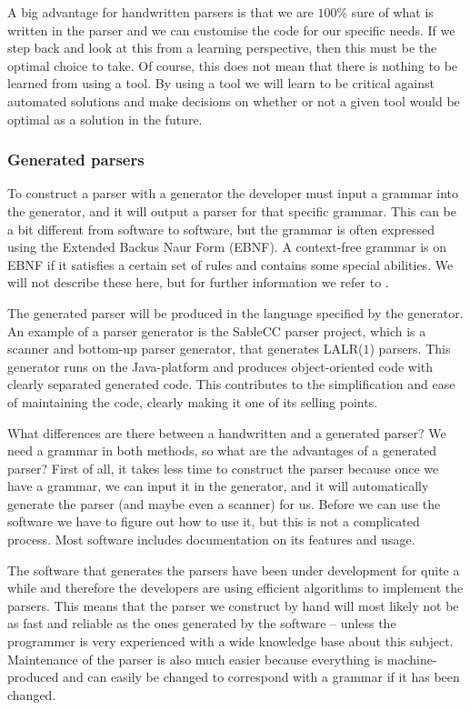 A big advantage for handwritten parsers is that we are $100 \%$ sure of what is
written in the parser and we can customise the code for our specific needs. If
we step back and look at this from a learning perspective, then this must be the
optimal choice to take. Of course, this does not mean that there is nothing to
be learned from using a tool. By using a tool we will learn to be critical
against automated solutions and make decisions on whether or not a given tool
would be optimal as a solution in the future.

\subsubsection{Generated parsers}
\label{subsec:generatedparsers}
To construct a parser with a generator the developer must input a grammar into
the generator, and it will output a parser for that specific grammar. This can
be a bit different from software to software, but the grammar is often expressed
using the Extended Backus Naur Form (EBNF). A context-free grammar is on EBNF if
it satisfies a certain set of rules and contains some special abilities. We will
not describe these here, but for further information we refer to \cite{fischer2009}.

The generated parser will be produced in the language specified by the
generator. An example of a parser generator is the SableCC parser project, which
is a scanner and bottom-up parser generator, that generates LALR($1$) parsers.
This generator runs on the Java-platform and produces object-oriented code with
clearly separated generated code. This contributes to the simplification and
ease of maintaining the code\cite[p.  11]{sableccdoc}, clearly making it one
of its selling points.

What differences are there between a handwritten and a generated parser?  We
need a grammar in both methods, so what are the advantages of a generated
parser? First of all, it takes less time to construct the parser because once we
have a grammar, we can input it in the generator, and it will automatically
generate the parser (and maybe even a scanner) for us. Before we can use the
software we have to figure out how to use it, but this is not a complicated
process. Most software includes documentation on its features and usage.

The software that generates the parsers have been under development for quite a
while and therefore the developers are using efficient algorithms to implement
the parsers. This means that the parser we construct by hand will most likely
not be as fast and reliable as the ones generated by the software -- unless the
programmer is very experienced with a wide knowledge base about this subject.
Maintenance of the parser is also much easier because everything is
machine-produced and can easily be changed to correspond with a grammar if it
has been changed.

